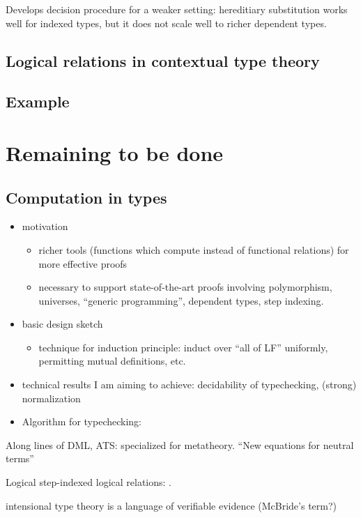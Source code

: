 \documentclass{article}
\begin{document}
Develops decision procedure for a weaker setting: hereditiary
substitution works well for indexed types, but it does not scale well
to richer dependent types. 

\subsection{Logical relations in contextual type theory}
\citep{Cave14}
\subsection{Example}
\section{Remaining to be done}
\subsection{Computation in types}
\begin{itemize}
\item motivation
\begin{itemize}
\item richer tools (functions which compute instead of functional
relations) for more effective proofs
\item necessary to support state-of-the-art proofs involving polymorphism,
universes, ``generic programming'', dependent types, step indexing.
\end{itemize}
\item basic design sketch
\begin{itemize}
\item technique for induction principle: induct over ``all of LF'' uniformly, permitting mutual definitions, etc.
\end{itemize}
\item technical results I am aiming to achieve: decidability
  of typechecking, (strong) normalization
\item Algorithm for typechecking: \citep{Coquand91,Harper05,Abel11}
\end{itemize}

Along lines of DML, ATS: specialized for metatheory. ``New equations for neutral terms'' \cite{Allais13}

Logical step-indexed logical relations: \cite{Dreyer11}.

intensional type theory is a language of verifiable evidence (McBride's term?)
\end{document}
